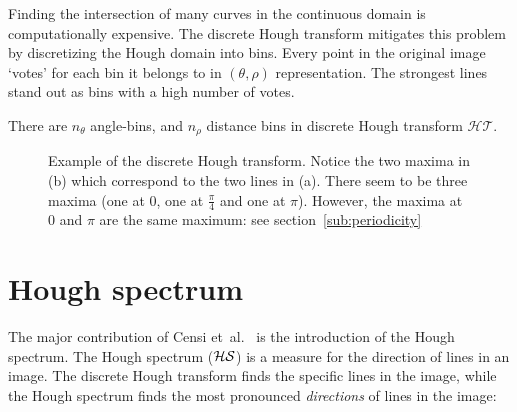 Finding the intersection of many curves in the continuous domain is computationally expensive. The discrete Hough transform mitigates this problem by discretizing the Hough domain into bins. Every point in the original image `votes' for each bin it belongs to in $(\theta, \rho)$ representation. The strongest lines stand out as bins with a high number of votes.

There are $n_\theta$ angle-bins, and $n_\rho$ distance bins in discrete Hough transform $\mathcal{HT}$. 

\begin{figure}[ht]
\centering
{}
\caption{Example of the discrete Hough transform. Notice the two maxima in (b) which correspond to the two lines in (a). There seem to be three maxima (one at $0$, one at $\frac{\pi}{4}$ and one at $\pi$). However, the maxima at $0$ and $\pi$ are the same maximum: see section~\ref{sub:periodicity}}
\label{fig:lines}
\end{figure}


\section{Hough spectrum}
The major contribution of Censi et~al.\ \cite{censi2005scan} is the introduction of the Hough spectrum. The Hough spectrum ($\cal HS$) is a measure for the direction of lines in an image. The discrete Hough transform finds the specific lines in the image, while the Hough spectrum finds the most pronounced \emph{directions} of lines in the image:

